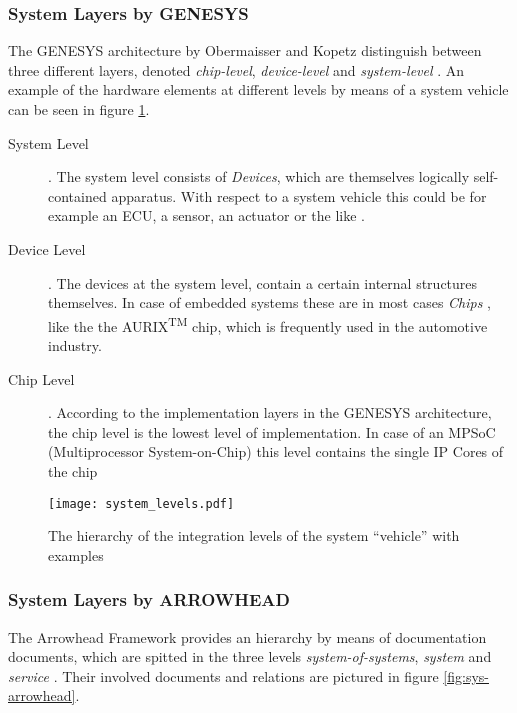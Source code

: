 \subsubsection{System Layers by GENESYS}
The GENESYS architecture by Obermaisser and Kopetz distinguish between three different layers, denoted \emph{chip-level}, \emph{device-level} and \emph{system-level} \cite[p.44]{genesys}. An example of the hardware elements at different levels by means of a system vehicle can be seen in figure \ref{fig:integration_levels}.
\begin{description}
\item [System Level] .
The system level consists of \emph{Devices}, which are themselves logically self-contained apparatus. With respect to a system vehicle this could be for example an ECU, a sensor, an actuator or the like \cite[p.45]{genesys}.
\item [Device Level] .
The devices at the system level, contain a certain internal structures themselves. In case of embedded systems these are in most cases \emph{Chips} \cite[p.45]{genesys}, like the the AURIX\textsuperscript{TM} chip, which is frequently used in the automotive industry.
\item [Chip Level] .
According to the implementation layers in the GENESYS architecture, the chip level is the lowest level of implementation. In case of an MPSoC (Multiprocessor System-on-Chip) this level contains the single IP Cores of the chip \cite[p.46]{genesys}
\end{description}

\begin{figure}[ht]
\centering
\texttt{[image: system\_levels.pdf]}
\caption{The hierarchy of the integration levels of the system ``vehicle'' with examples}
\label{fig:integration_levels}
\end{figure}

\subsubsection{System Layers by ARROWHEAD}

The Arrowhead Framework provides an hierarchy by means of documentation documents, which are spitted in the three levels \emph{system-of-systems}, \emph{system} and \emph{service} \cite{arrowhead_inpr}. Their involved documents and relations are pictured in figure \ref{fig:sys-arrowhead}.

